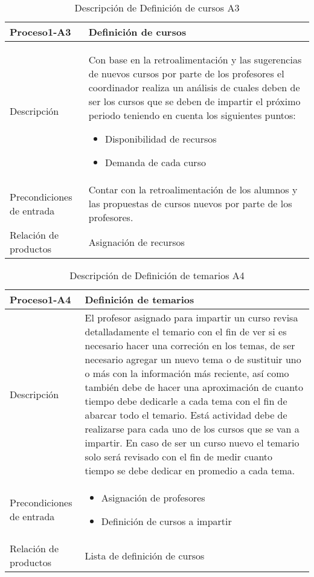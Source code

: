\begin{table}[H]
	\centering
	\begin{tabular}{p{5cm} p{11cm}}
		\hline
		\textbf{Proceso1-A3} & \textbf{Definici\'on de cursos}\\
		\hline\hline
		Descripción & Con base en la retroalimentaci\'on y las sugerencias de nuevos cursos por parte de los profesores el coordinador realiza un an\'alisis de cuales deben de ser los cursos que se deben de impartir el pr\'oximo periodo teniendo en cuenta los siguientes puntos:
		\begin{itemize}
			\item Disponibilidad de recursos
			\item Demanda de cada curso
		\end{itemize}
		 \\
		\hline
		Precondiciones de entrada & Contar con la retroalimentaci\'on de los alumnos y las propuestas de cursos nuevos por parte de los profesores. \\					
		\hline
		Relación de productos & Asignaci\'on de recursos\\
		\hline
	\end{tabular}
	\caption{Descripción de Definici\'on de cursos A3}
\end{table}


\begin{table}[H]
	\centering
	\begin{tabular}{p{5cm} p{11cm}}
		\hline
		\textbf{Proceso1-A4} & \textbf{Definici\'on de temarios}\\
		\hline\hline
		Descripción & El profesor asignado para impartir un curso revisa detalladamente el temario con el fin de ver si es necesario hacer una correci\'on en los temas, de ser necesario agregar un nuevo tema o de sustituir uno o m\'as con la informaci\'on m\'as reciente, as\'i como tambi\'en debe de hacer una aproximaci\'on de cuanto tiempo debe dedicarle a cada tema con el fin de abarcar todo el temario. Est\'a actividad debe de realizarse para cada uno de los cursos que se van a impartir. En caso de ser un curso nuevo el temario solo ser\'a revisado con el fin de medir cuanto tiempo se debe dedicar en promedio a cada tema.\\ 
		\hline
		Precondiciones de entrada & 
		\begin{itemize}
			\item Asignaci\'on de profesores
			\item Definici\'on de cursos a impartir
		\end{itemize}
		\\					
		\hline
		Relación de productos & Lista de definici\'on de cursos\\
		\hline
	\end{tabular}
	\caption{Descripción de Definici\'on de temarios A4}
\end{table}
